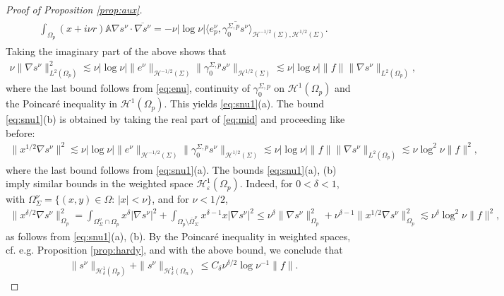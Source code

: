 \documentclass[report]{elsarticle}
\numberwithin{theorem}{section}
\newcommand{\re}{\varepsilon}
\begin{document}
\begin{proof}[Proof of Proposition \ref{prop:aux}]
	\begin{align}
		\label{eq:mid}
		\begin{split}
			\int_{\Omega_p}(x+i\nu r)\mathbb{A}\nabla s^{\nu}\cdot\overline{\nabla s^{\nu}}=-\nu|\log\nu|\langle e^{\nu}_p, \overline{\gamma_{0}^{\Sigma,p}s^{\nu}}\rangle_{\mathcal{H}^{-1/2}(\Sigma), \mathcal{H}^{1/2}(\Sigma)}.
		\end{split}
	\end{align}
	Taking the imaginary part of the above shows that 
	\begin{align*}
		\nu\|\nabla s^{\nu}\|^2_{L^2(\Omega_p)}\lesssim \nu |\log\nu|\|e^{\nu}\|_{\mathcal{H}^{-1/2}(\Sigma)}\|\gamma_0^{\Sigma,p}s^{\nu}\|_{\mathcal{H}^{1/2}(\Sigma)}\lesssim \nu|\log\nu| \|f\|\|\nabla s^{\nu}\|_{L^2(\Omega_p)}, 
	\end{align*}
	where the last bound follows from \eqref{eq:enu},   continuity of $\gamma_0^{\Sigma,p}$ on $\mathcal{H}^1(\Omega_p)$ and the Poincar\'e inequality in $\mathcal{H}^1(\Omega_p)$. This yields \eqref{eq:snu1}(a). The bound \eqref{eq:snu1}(b) is obtained by taking the real part of \eqref{eq:mid} and proceeding like before: 
	\begin{align*}
		\|x^{1/2}\nabla s^{\nu}\|^2\lesssim \nu |\log\nu|\|e^{\nu}\|_{\mathcal{H}^{-1/2}(\Sigma)}\|\gamma_0^{\Sigma,p}s^{\nu}\|_{\mathcal{H}^{1/2}(\Sigma)}\lesssim \nu|\log\nu| \|f\|\|\nabla s^{\nu}\|_{L^2(\Omega_p)}\lesssim \nu \log^2\nu \|f\|^2, 
	\end{align*}
	where the last bound follows from \eqref{eq:snu1}(a).
	The bounds \eqref{eq:snu1}(a), (b) imply similar bounds in the weighted space $\mathcal{H}^1_{\re}(\Omega_p)$. Indeed, for $0<\delta<1$, with $\Omega_{\Sigma}^{\nu}=\{(x,y)\in \Omega: \, |x|<\nu\}$, and for $\nu<1/2$,  
	\begin{align*}
		\|x^{\delta/2}\nabla s^{\nu}\|^2_{\Omega_p}=\int_{\Omega_{\Sigma}^{\nu}\cap \Omega_p}x^{\delta}|\nabla s^{\nu}|^2+\int_{\Omega_p\setminus \overline{\Omega}_{\Sigma}^{\nu}}x^{\delta-1}x|\nabla s^{\nu}|^2\leq \nu^{\delta}\|\nabla s^{\nu}\|^2_{\Omega_p}+\nu^{\delta-1}\|x^{1/2}\nabla s^{\nu}\|^2_{\Omega_p}
		\lesssim \nu^{\delta}\log^2\nu\|f\|^2,
	\end{align*}
	as follows from \eqref{eq:snu1}(a), (b). By the Poincar\'e inequality in weighted spaces, cf. e.g.  Proposition \ref{prop:hardy}, and with the above bound, we conclude that 
	\begin{align}
		\label{eq:boundsnu}
		\|s^{\nu}\|_{\mathcal{H}_{\delta}^1(\Omega_p)}+	\|s^{\nu}\|_{\mathcal{H}_{\delta}^1(\Omega_n)}\leq C_{\delta} \nu^{\delta/2}\log\nu^{-1}\|f\|.

\end{align}
\end{proof}
\end{document}

